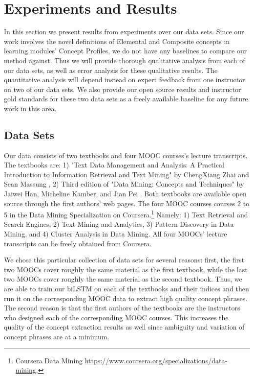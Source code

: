 \section{Experiments and Results}
In this section we present results from experiments over our data sets. Since our work involves the novel definitions of Elemental and Composite concepts in learning modules' Concept Profiles, we do not have any baselines to compare our method against. Thus we will provide thorough qualitative analysis from each of our data sets, as well as error analysis for these qualitative results. The quantitative analysis will depend instead on expert feedback from one instructor on two of our data sets. We also provide our open source results and instructor gold standards for these two data sets as a freely available baseline for any future work in this area.

\subsection{Data Sets}
Our data consists of two textbooks and four MOOC courses's lecture transcripts. The textbooks are: 1) "Text Data Management and Analysis: A Practical Introduction to Information Retrieval and Text Mining" by ChengXiang Zhai and Sean Massung \cite{} , 2) Third edition of "Data Mining: Concepts and Techniques" by Jaiwei Han, Micheline Kamber, and Jian Pei \cite{}. Both textbooks are available open source through the first authors' web pages. The four MOOC courses courses 2 to 5 in the Data Mining Specialization on Coursera.\footnote{Coursera Data Mining \url{https://www.coursera.org/specializations/data-mining}.} Namely: 1) Text Retrieval and Search Engines, 2) Text Mining and Analytics, 3) Pattern Discovery in Data Mining, and 4) Cluster Analysis in Data Mining. All four MOOCs' lecture transcripts can be freely obtained from Coursera.

We chose this particular collection of data sets for several reasons: first, the first two MOOCs cover roughly the same material as the first textbook, while the last two MOOCs cover roughly the same material as the second textbook. Thus, we are able to train our biLSTM on each of the textbooks and their indices and then run it on the corresponding MOOC data to extract high quality concept phrases. The second reason is that the first authors of the textbooks are the instructors who designed each of the corresponding MOOC courses. This increases the quality of the concept extraction results as well since ambiguity and variation of concept phrases are at a minimum.


